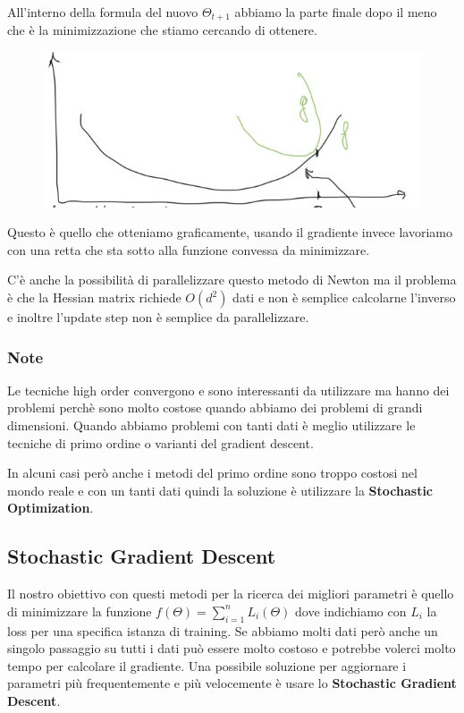 \documentclass[14pt]{extreport}
\begin{document}
All'interno della formula del nuovo $\Theta_{t+1}$ abbiamo la parte finale dopo il meno che è la minimizzazione che stiamo cercando di ottenere.
\begin{figure}[H]
	\centering
	\includegraphics[width=0.7\linewidth]{258.jpeg}
\end{figure}

Questo è quello che otteniamo graficamente, usando il gradiente invece lavoriamo con una retta che sta sotto alla funzione convessa da minimizzare.

C'è anche la possibilità di parallelizzare questo metodo di Newton ma il problema è che la Hessian matrix richiede $O(d^2)$ dati e non è semplice
calcolarne l'inverso e inoltre l'update step non è semplice da parallelizzare.

\subsubsection{Note}

Le tecniche high order convergono e sono interessanti da utilizzare ma hanno dei problemi perchè sono molto costose quando abbiamo dei problemi di
grandi dimensioni. Quando abbiamo problemi con tanti dati è meglio utilizzare le tecniche di primo ordine o varianti del gradient descent.

In alcuni casi però anche i metodi del primo ordine sono troppo costosi nel mondo reale e con un tanti dati quindi la soluzione è utilizzare la
\textbf{Stochastic Optimization}.

\subsection{Stochastic Gradient Descent}

Il nostro obiettivo con questi metodi per la ricerca dei migliori parametri è quello di minimizzare la funzione $f(\Theta) = \sum_{i=1}^n L_i(\Theta)$
dove indichiamo con $L_i$ la loss per una specifica istanza di training. Se abbiamo molti dati però anche un singolo passaggio su tutti i dati può
essere molto costoso e potrebbe volerci molto tempo per calcolare il gradiente. Una possibile soluzione per aggiornare i parametri più frequentemente
e più velocemente è usare lo \textbf{Stochastic Gradient Descent}.
\end{document}
